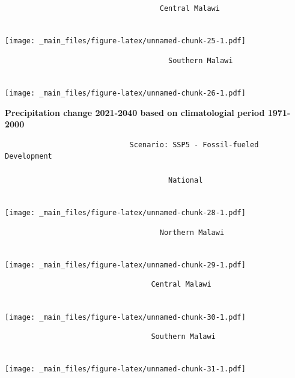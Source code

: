 \documentclass[
]{book}
\begin{document}
\begin{verbatim}
                                    Central Malawi
                        
\end{verbatim}

\texttt{[image: \_main\_files/figure-latex/unnamed-chunk-25-1.pdf]}

\begin{verbatim}
                                      Southern Malawi
                                      
\end{verbatim}

\texttt{[image: \_main\_files/figure-latex/unnamed-chunk-26-1.pdf]}

\textbf{Precipitation change 2021-2040 based on climatologial period 1971-2000}

\begin{verbatim}
                             Scenario: SSP5 - Fossil-fueled Development
                                     
                                      National
                        
\end{verbatim}

\texttt{[image: \_main\_files/figure-latex/unnamed-chunk-28-1.pdf]}

\begin{verbatim}
                                    Northern Malawi
                            
\end{verbatim}

\texttt{[image: \_main\_files/figure-latex/unnamed-chunk-29-1.pdf]}

\begin{verbatim}
                                  Central Malawi
                    
\end{verbatim}

\texttt{[image: \_main\_files/figure-latex/unnamed-chunk-30-1.pdf]}

\begin{verbatim}
                                  Southern Malawi
  
\end{verbatim}

\texttt{[image: \_main\_files/figure-latex/unnamed-chunk-31-1.pdf]}
\end{document}
